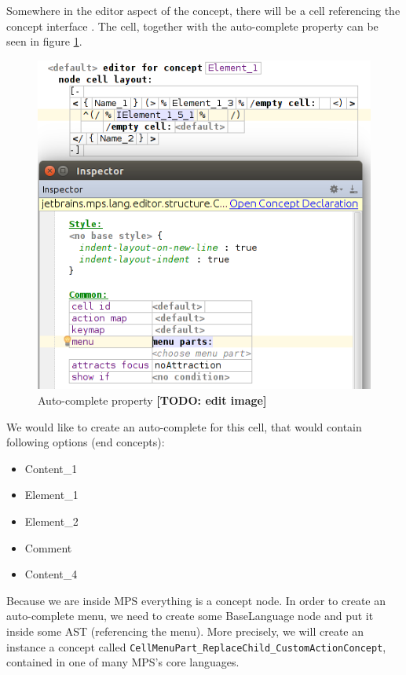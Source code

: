 Somewhere in the editor aspect of the  concept, there will be a cell referencing the concept interface . 
The cell, together with the auto-complete property can be seen in figure \ref{fig:autocomplete_cell}.

\begin{figure}[h]
	\centering
	\includegraphics[width=\textwidth]{./img/autocomplete_cell.png}
	\caption{Auto-complete property \textbf{[TODO: edit image]}}
	\label{fig:autocomplete_cell}
\end{figure}

We would like to create an auto-complete for this cell, that would contain following options (end concepts):

\begin{itemize}
	\item Content{\_}1
	\item Element{\_}1
	\item Element{\_}2
	\item Comment
	\item Content{\_}4
\end{itemize}

Because we are inside MPS everything is a concept node.
In order to create an auto-complete menu, we need to create some BaseLanguage node and put it inside some AST (referencing the menu).
More precisely, we will create an instance a concept called \texttt{CellMenuPart{\_}ReplaceChild{\_}CustomActionConcept}, contained in one of many MPS's core languages.
\\

